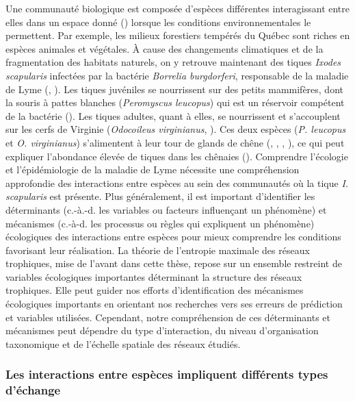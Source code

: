 Une communauté biologique est composée d'espèces différentes interagissant entre
elles dans un espace donné (\cite{Stroud2015Community}) lorsque les conditions
environnementales le permettent. Par exemple, les milieux forestiers tempérés du
Québec sont riches en espèces animales et végétales. À cause des changements
climatiques et de la fragmentation des habitats naturels, on y retrouve
maintenant des tiques \textit{Ixodes scapularis} infectées par la bactérie
\textit{Borrelia burgdorferi}, responsable de la maladie de Lyme
(\cite{Ogden2009Emergence}, \cite{Simon2014Climate}). Les tiques juvéniles se
nourrissent sur des petits mammifères, dont la souris à pattes blanches
(\textit{Peromyscus leucopus}) qui est un réservoir compétent de la bactérie
(\cite{Donahue1987Reservoir}). Les tiques adultes, quant à elles, se nourrissent
et s'accouplent sur les cerfs de Virginie (\textit{Odocoileus virginianus},
\cite{Lane1991Lyme}). Ces deux espèces (\textit{P. leucopus} et \textit{O.
virginianus}) s'alimentent à leur tour de glands de chêne
(\cite{McShea1993Variablea}, \cite{Elkinton1996Interactions},
\cite{Wolff1996Population}, \cite{McShea2000Influence}), ce qui peut expliquer
l'abondance élevée de tiques dans les chênaies (\cite{Ostfeld2006Climate}).
Comprendre l'écologie et l'épidémiologie de la maladie de Lyme nécessite une
compréhension approfondie des interactions entre espèces au sein des communautés
où la tique \textit{I. scapularis} est présente. Plus généralement, il est
important d'identifier les déterminants (c.-à.-d. les variables ou facteurs
influençant un phénomène) et mécanismes (c.-à-d. les processus ou règles qui
expliquent un phénomène) écologiques des interactions entre espèces pour mieux
comprendre les conditions favorisant leur réalisation. La théorie de l'entropie
maximale des réseaux trophiques, mise de l'avant dans cette thèse, repose sur un
ensemble restreint de variables écologiques importantes déterminant la structure
des réseaux trophiques. Elle peut guider nos efforts d'identification des
mécanismes écologiques importants en orientant nos recherches vers ses erreurs
de prédiction et variables utilisées. Cependant, notre compréhension de ces
déterminants et mécanismes peut dépendre du type d'interaction, du niveau
d'organisation taxonomique et de l'échelle spatiale des réseaux étudiés. 

\subsubsection{Les interactions entre espèces impliquent différents types d'échange} 

